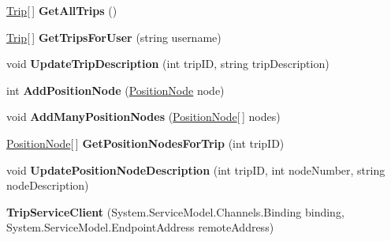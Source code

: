 \begin{DoxyCompactItemize}
\item 
\hypertarget{class_trip_service_client_ad0f3f0ca90e152969c21c29bc0bab90e}{
\hyperlink{class_trip}{Trip}\mbox{[}$\,$\mbox{]} {\bfseries GetAllTrips} ()}
\label{class_trip_service_client_ad0f3f0ca90e152969c21c29bc0bab90e}

\item 
\hypertarget{class_trip_service_client_a747b67426ba816f5dac7a1a1416a5e38}{
\hyperlink{class_trip}{Trip}\mbox{[}$\,$\mbox{]} {\bfseries GetTripsForUser} (string username)}
\label{class_trip_service_client_a747b67426ba816f5dac7a1a1416a5e38}

\item 
\hypertarget{class_trip_service_client_a5c349058df8edf45d7f20de96fbf01b7}{
void {\bfseries UpdateTripDescription} (int tripID, string tripDescription)}
\label{class_trip_service_client_a5c349058df8edf45d7f20de96fbf01b7}

\item 
\hypertarget{class_trip_service_client_a9c71c96ccffe17725458e67e0a8eb146}{
int {\bfseries AddPositionNode} (\hyperlink{class_position_node}{PositionNode} node)}
\label{class_trip_service_client_a9c71c96ccffe17725458e67e0a8eb146}

\item 
\hypertarget{class_trip_service_client_ab447a0352c8c2fd66eaa33e7f363ee1c}{
void {\bfseries AddManyPositionNodes} (\hyperlink{class_position_node}{PositionNode}\mbox{[}$\,$\mbox{]} nodes)}
\label{class_trip_service_client_ab447a0352c8c2fd66eaa33e7f363ee1c}

\item 
\hypertarget{class_trip_service_client_ad9979633d5094e6fac28fbbd89914ee8}{
\hyperlink{class_position_node}{PositionNode}\mbox{[}$\,$\mbox{]} {\bfseries GetPositionNodesForTrip} (int tripID)}
\label{class_trip_service_client_ad9979633d5094e6fac28fbbd89914ee8}

\item 
\hypertarget{class_trip_service_client_aef551495acee0ff6456fcd99df1e1a7e}{
void {\bfseries UpdatePositionNodeDescription} (int tripID, int nodeNumber, string nodeDescription)}
\label{class_trip_service_client_aef551495acee0ff6456fcd99df1e1a7e}

\item 
\hypertarget{class_trip_service_client_a74f3aec249adc60fef595b722d37599c}{
{\bfseries TripServiceClient} (System.ServiceModel.Channels.Binding binding, System.ServiceModel.EndpointAddress remoteAddress)}
\label{class_trip_service_client_a74f3aec249adc60fef595b722d37599c}


\end{DoxyCompactItemize}
